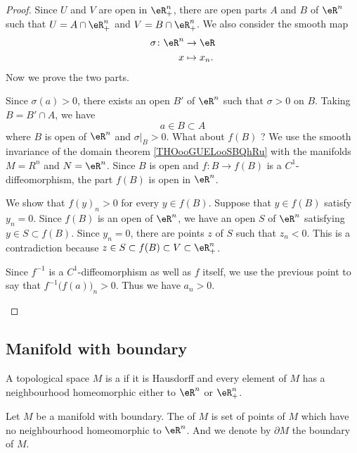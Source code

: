 \begin{proof}
	Since \( U\) and \( V\) are open in \( \eR^n_+\), there are open parts \( A\) and \( B\) of \( \eR^n\) such that \( U=A\cap \eR^n_+\) and \( V=B\cap \eR^n_+\). We also consider the smooth map
	\begin{equation}
		\begin{aligned}
			\sigma\colon \eR^n & \to \eR      \\
			x                  & \mapsto x_n.
		\end{aligned}
	\end{equation}
	Now we prove the two  parts.
	\begin{subproof}
		\spitem[Suppose \( a_n>0\)]
		Since \( \sigma(a)>0\), there exists an open \( B'\) of \( \eR^n\) such that \( \sigma>0\) on \( B\). Taking \( B=B'\cap A\), we have
		\begin{equation}
			a\in B\subset A
		\end{equation}
		where \( B\) is open of \( \eR^n\) and \( \sigma|_B>0\). What about \( f(B)\) ? We use the smooth invariance of the domain theorem \ref{THOooGUELooSBQhRu} with the manifolds \( M=R^n\) and \( N=\eR^n\). Since \( B\) is open and \(f \colon B\to f(B)  \) is a \( C^1\)-diffeomorphism, the part \( f(B)\) is open in \( \eR^n\).

		We show that \( f(y)_n>0\) for every \( y\in f(B)\). Suppose that \( y\in f(B)\) satisfy \( y_n=0\). Since \( f(B)\) is an open of \( \eR^n\), we have an open \( S\) of \( \eR^n\) satisfying \( y\in S\subset f(B)\). Since \( y_n=0\), there are points \( z\) of \( S\) such that \( z_n<0\). This is a contradiction because \( z\in S\subset f(B)\subset V\subset \eR^n_+\).

		\spitem[Suppose \( f(a)_n>0\)]
		Since \( f^{-1}\) is a \( C^1\)-diffeomorphism as well as \( f\) itself, we use the previous point to say that \( f^{-1}\big( f(a) \big)_n>0\). Thus we have \( a_n>0\).
	\end{subproof}
\end{proof}

\subsection{Manifold with boundary}

\begin{definition}	\label{DEFooNETXooZaZMcm}
	A topological space \( M\) is a  if it is Hausdorff and every element of \( M\) has a neighbourhood homeomorphic either to \( \eR^n\) or \( \eR^{n}_+\).

	Let \( M\) be a manifold with boundary. The  of \( M\) is set of points of \( M\) which have no neighbourhood homeomorphic to \( \eR^n\). And we denote by \( \partial M\) the boundary of \( M\).
\end{definition}

